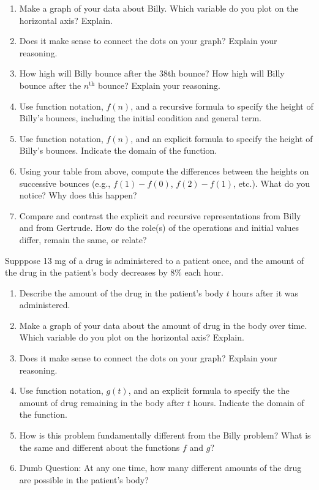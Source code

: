 \documentclass[nooutcomes]{ximera}
\begin{document}
\begin{problem}
\begin{enumerate}
\item Make a graph of your data about Billy.  Which variable do you plot on the horizontal axis?  Explain.  

\item Does it make sense to connect the dots on your graph?  Explain your reasoning.  

\item How high will Billy bounce after the 38th bounce?  How high will Billy bounce after the $n^\mathrm{th}$ bounce?  Explain your reasoning. 

\item  Use function notation, $f(n)$, and a recursive formula to specify the height of Billy's bounces, including the initial condition and general term.   

\item Use function notation, $f(n)$, and an explicit formula to specify the height of Billy's bounces.  Indicate the domain of the function.    

\item Using your table from above, compute the differences between the heights on successive bounces (e.g.,  $f(1) - f(0)$, $f(2) - f(1)$, etc.).  What do you notice?  Why does this happen?

\item Compare and contrast the explicit and recursive representations from Billy and from Gertrude.  How do the role(s) of the operations and initial values differ, remain the same, or relate?
\end{enumerate}
\end{problem}

\begin{problem}
Supppose 13 mg of a drug is administered to a patient once, and the amount of the drug in the patient's body decreases by 8\% each hour.  
\begin{enumerate}
\item Describe the amount of the drug in the patient's body $t$ hours after it was administered.  

\item Make a graph of your data about the amount of drug in the body over time.  Which variable do you plot on the horizontal axis?  Explain.  

\item Does it make sense to connect the dots on your graph?  Explain your reasoning.  

\item Use function notation, $g(t)$, and an explicit formula to specify the the amount of drug remaining in the body after $t$ hours.  Indicate the domain of the function. 

\item How is this problem fundamentally different from the Billy problem?  What is the same and different about the functions $f$ and $g$?  

\item Dumb Question:  At any one time, how many different amounts of the drug are possible in the patient's body?
\end{enumerate}
\end{problem}
\end{document}
